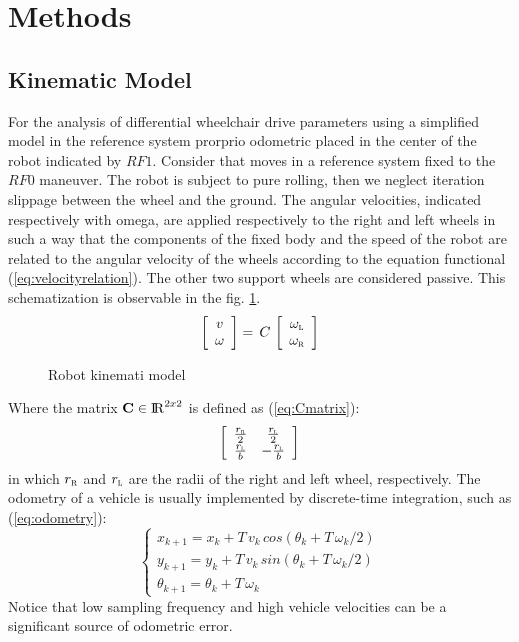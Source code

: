 \section{Methods}
\subsection{Kinematic Model}
For the analysis of differential wheelchair drive parameters using a simplified model in the reference system prorprio odometric placed in the center of the robot indicated by $RF1$. Consider that moves in a reference system fixed to the $RF0$ maneuver.
The robot is subject to pure rolling, then we neglect iteration slippage between the wheel and the ground. The angular velocities, indicated respectively with omega, are applied respectively to the right and left wheels in such a way that the components of the fixed body and the speed of the robot are related to the angular velocity of the wheels according to the equation functional (\ref{eq:velocityrelation}).
The other two support wheels are considered passive. This schematization is observable in the fig. \ref{fig:model}.
\begin{equation}
\label{eq:velocityrelation}
	\left[ \begin{array}{cc}
				v	\\									
				\omega 							
			 \end{array} 
	\right]  =\, C\,
	\left[ \begin{array}{cc}
 				\omega_\textsc{l} \\ 
				\omega_\textsc{r}
			 \end{array} 
	\right]
\end{equation}

\begin{figure}[!h]
\centering
    \resizebox{.8\linewidth}{!}{}
\caption{Robot kinemati model}
\label{fig:model}
\end{figure}
\noindent Where the matrix $\textbf{C} \in \operatorname{\rm I\!R}^{2 x 2}$ is defined as (\ref{eq:Cmatrix}):
\begin{equation}
\label{eq:Cmatrix}
	\left[ \begin{array}{cc}
 				\frac{r_\textsc{r}}{2} &	\frac{r_\textsc{l}}{2} \\
				\frac{r_\textsc{l}}{b} &	-\frac{r_\textsc{l}}{b} 
			 \end{array} 
	\right]
\end{equation}
in which $r_\textsc{r}$ and $r_\textsc{l}$ are the radii of the right and left wheel, respectively.
The odometry of a vehicle is usually implemented by discrete-time integration, such as (\ref{eq:odometry}):
\begin{equation}
\label{eq:odometry}
	\begin{cases}
		x_{k+1} = x_{k} + T \, v_{k} \, cos(\theta_{k} + T \,\omega_{k}/2)\\
		y_{k+1} = y_{k} + T \, v_{k} \, sin(\theta_{k} + T \, \omega_{k}/2)\\
		\theta_{k+1} = \theta_{k} + T \, \omega_{k}
	\end{cases}
\end{equation}           
Notice that low sampling frequency and high vehicle velocities can be a significant source of odometric error.

